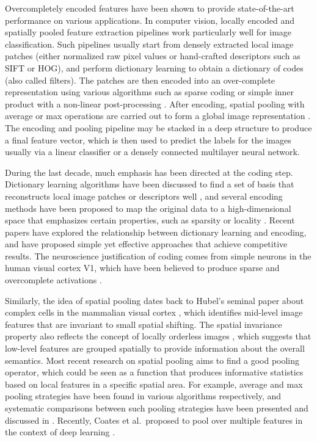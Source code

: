 Overcompletely encoded features have been shown to provide state-of-the-art performance on various applications. In computer vision, locally encoded and spatially pooled feature extraction pipelines work particularly well for image classification. Such pipelines usually start from densely extracted local image patches (either normalized raw pixel values or hand-crafted descriptors such as SIFT or HOG), and perform dictionary learning to obtain a dictionary of codes (also called filters). The patches are then encoded into an over-complete representation using various algorithms such as sparse coding \cite{Olshausen:1997uh,wang2010locality} or simple inner product with a non-linear post-processing \cite{coates2011icml,krizhevsky2012imagenet}. After encoding, spatial pooling with average or max operations are carried out to form a global image representation \cite{Yang:2009vb,Boureau:uq}. The encoding and pooling pipeline may be stacked in a deep structure to produce a final feature vector, which is then used to predict the labels for the images usually via a linear classifier or a densely connected multilayer neural network.

During the last decade, much emphasis has been directed at the coding step. Dictionary learning algorithms have been discussed to find a set of basis that reconstructs local image patches or descriptors well \cite{mairal2010online,coates2011icml}, and several encoding methods have been proposed to map the original data to a high-dimensional space that emphasizes certain properties, such as sparsity \cite{Olshausen:1997uh,Yang:2009vb,yang2010efficient} or locality \cite{wang2010locality}. Recent papers \cite{coates2010aistats, Rigamonti:2011uc, coates2011icml} have explored the relationship between dictionary learning and encoding, and have proposed simple yet effective approaches that achieve competitive results. The neuroscience justification of coding comes from simple neurons in the human visual cortex V1, which have been believed to produce sparse and overcomplete activations \cite{Olshausen:1997uh}.

Similarly, the idea of spatial pooling dates back to Hubel's seminal paper about complex cells in the mammalian visual cortex \cite{Hubel:1962vm}, which identifies mid-level image features that are invariant to small spatial shifting. The spatial invariance property also reflects the concept of locally orderless images \cite{Koenderink:1999bh}, which suggests that low-level features are grouped spatially to provide information about the overall semantics. Most recent research on spatial pooling aims to find a good pooling operator, which could be seen as a function that produces informative statistics based on local features in a specific spatial area. For example, average and max pooling strategies have been found in various algorithms respectively, and systematic comparisons between such pooling strategies have been presented and discussed in \cite{Boureau:uq,Boureau:2010wz}. Recently, Coates et al.\ proposed to pool over multiple features in the context of deep learning \cite{coates2011selecting}.


